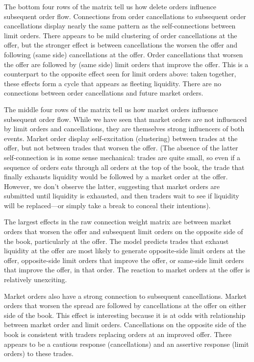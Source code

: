		The bottom four rows of the matrix tell us how delete orders influence subsequent order flow. Connections from order cancellations to subsequent order cancellations display nearly the same pattern as the self-connections between limit orders. There appears to be mild clustering of order cancellations at the offer, but the stronger effect is between cancellations the worsen the offer and following (same side) cancellations at the offer. Order cancellations that worsen the offer are followed by (same side) limit orders that improve the offer. This is a counterpart to the opposite effect seen for limit orders above: taken together, these effects form a cycle that appears as fleeting liquidity. There are no connections between order cancellations and future market orders.

		The middle four rows of the matrix tell us how market orders influence subsequent order flow. While  we have seen that market orders are not influenced by limit orders and cancellations, they are themselves strong influencers of both events. Market order display self-excitation (clustering) between trades at the offer, but not between trades that worsen the offer. (The absence of the latter self-connection is in some sense mechanical: trades are quite small, so even if a sequence of orders eats through all orders at the top of the book, the trade that finally exhausts liquidity would be followed by a market order at the offer. However, we don’t observe the latter, suggesting that market orders are submitted until liquidity is exhausted, and then traders wait to see if liquidity will be replaced—or simply take a break to conceal their intentions).

		The largest effects in the raw connection weight matrix are between market orders that worsen the offer and subsequent limit orders on the opposite side of the book, particularly at the offer. The model predicts trades that exhaust liquidity at the offer are most likely to generate opposite-side limit orders at the offer, opposite-side limit orders that improve the offer, or same-side limit orders that improve the offer, in that order. The reaction to market orders at the offer is relatively unexciting.

		Market orders also have a strong connection to subsequent cancellations. Market orders that worsen the spread are followed by cancellations at the offer on either side of the book. This effect is interesting because it is at odds with relationship between market order and limit orders. Cancellations on the opposite side of the book is consistent with traders replacing orders at an improved offer. There appears to be a cautious response (cancellations) and an assertive response (limit orders) to these trades.

